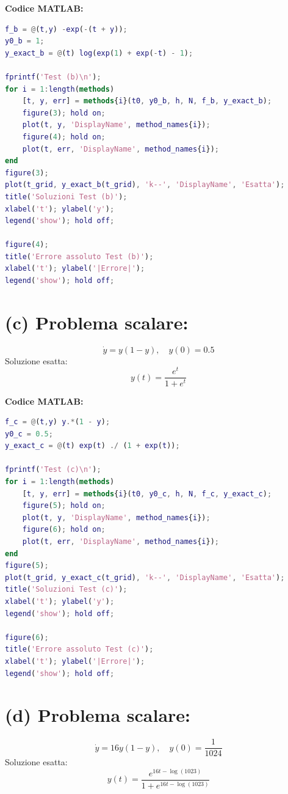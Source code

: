 \documentclass[12pt,a4paper]{article}
\begin{document}
\noindent
\textbf{Codice MATLAB:}
\begin{lstlisting}[language=Matlab]
f_b = @(t,y) -exp(-(t + y));
y0_b = 1;
y_exact_b = @(t) log(exp(1) + exp(-t) - 1);

fprintf('Test (b)\n');
for i = 1:length(methods)
    [t, y, err] = methods{i}(t0, y0_b, h, N, f_b, y_exact_b);
    figure(3); hold on;
    plot(t, y, 'DisplayName', method_names{i});
    figure(4); hold on;
    plot(t, err, 'DisplayName', method_names{i});
end
figure(3);
plot(t_grid, y_exact_b(t_grid), 'k--', 'DisplayName', 'Esatta');
title('Soluzioni Test (b)');
xlabel('t'); ylabel('y');
legend('show'); hold off;

figure(4);
title('Errore assoluto Test (b)');
xlabel('t'); ylabel('|Errore|');
legend('show'); hold off;
\end{lstlisting}
\newpage
\section*{(c) Problema scalare:}  
\[
\dot{y} = y (1 - y), \quad y(0) = 0.5
\]
Soluzione esatta:  
\[
y(t) = \frac{e^t}{1 + e^t}
\]

\noindent
\textbf{Codice MATLAB:}
\begin{lstlisting}[language=Matlab]
f_c = @(t,y) y.*(1 - y);
y0_c = 0.5;
y_exact_c = @(t) exp(t) ./ (1 + exp(t));

fprintf('Test (c)\n');
for i = 1:length(methods)
    [t, y, err] = methods{i}(t0, y0_c, h, N, f_c, y_exact_c);
    figure(5); hold on;
    plot(t, y, 'DisplayName', method_names{i});
    figure(6); hold on;
    plot(t, err, 'DisplayName', method_names{i});
end
figure(5);
plot(t_grid, y_exact_c(t_grid), 'k--', 'DisplayName', 'Esatta');
title('Soluzioni Test (c)');
xlabel('t'); ylabel('y');
legend('show'); hold off;

figure(6);
title('Errore assoluto Test (c)');
xlabel('t'); ylabel('|Errore|');
legend('show'); hold off;
\end{lstlisting}

\vspace{2em}

\newpage
\section*{(d) Problema scalare:}  
\[
\dot{y} = 16 y (1 - y), \quad y(0) = \frac{1}{1024}
\]
Soluzione esatta:  
\[
y(t) = \frac{e^{16t - \log(1023)}}{1 + e^{16t - \log(1023)}}
\]
\end{document}
